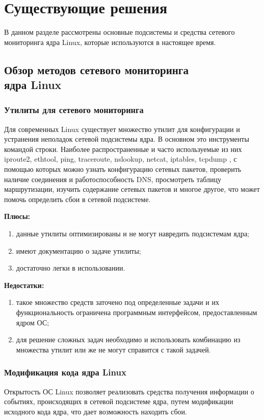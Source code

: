 \chapter{Существующие решения}

В данном разделе рассмотрены основные подсистемы и средства сетевого мониторинга ядра Linux, которые используются в настоящее время.

\section[Обзор средств сетевого мониторинга ядра Linux]{Обзор методов сетевого мониторинга \\ ядра Linux}

\subsection{Утилиты для сетевого мониторинга}
Для современных Linux существует множество утилит для конфигурации и устранения неполадок сетевой подсистемы ядра. 
В основном это инструменты командой строки.  
Наиболее распространенные и часто используемые из них iproute2, ethtool, ping, traceroute, nslookup, netcat, iptables, tcpdump \cite{}, с помощью которых можно узнать конфигурацию сетевых пакетов, проверить наличие соединения и работоспособность DNS, просмотреть таблицу маршрутизации, изучить содержание сетевых пакетов и многое другое, что может помочь определить сбои в сетевой подсистеме.

\textbf{Плюсы:}
\begin{enumerate}
	\item данные утилиты оптимизированы и не могут навредить подсистемам ядра;
	\item имеют документацию о задаче утилиты;
	\item достаточно легки в использовании.
\end{enumerate}

\textbf{Недостатки:}
\begin{enumerate}
	\item такое множество средств заточено под определенные задачи и их функциональность ограничена программным интерфейсом, предоставленным ядром ОС;
	\item для решение сложных задач необходимо и использовать комбинацию из множества утилит или же не могут справится с такой задачей.
\end{enumerate}

\subsection{Модификация кода ядра Linux}
Открытость ОС Linux позволяет реализовать средства получения информации о событиях, происходящих в сетевой подсистеме ядра, путем модификации исходного кода ядра, что дает возможность находить сбои.

